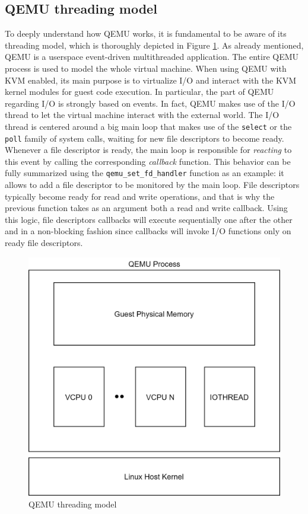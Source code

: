 \subsection{QEMU threading model}
To deeply understand how QEMU works, it is fundamental to be aware of its threading model, which is thoroughly depicted in Figure \ref{fig:qemu}. As already mentioned, QEMU is a userspace event-driven multithreaded application. The entire QEMU process is used to model the whole virtual machine. When using QEMU with KVM enabled, its main purpose is to virtualize I/O and interact with the KVM kernel modules for guest code execution. In particular, the part of QEMU regarding I/O is strongly based on events. In fact, QEMU makes use of the I/O thread to let the virtual machine interact with the external world. The I/O thread is centered around a big main loop that makes use of the \texttt{select} or the \texttt{poll} family of system calls, waiting for new file descriptors to become ready. Whenever a file descriptor is ready, the main loop is responsible for \emph{reacting} to this event by calling the corresponding \emph{callback} function. This behavior can be fully summarized using the \texttt{qemu\_set\_fd\_handler} function as an example: it allows to add a file descriptor to be monitored by the main loop. File descriptors typically become ready for read and write operations, and that is why the previous function takes as an argument both a read and write callback. Using this logic, file descriptors callbacks will execute sequentially one after the other and in a non-blocking fashion since callbacks will invoke I/O functions only on ready file descriptors.

\begin{figure}[t]
    \centering
    \includegraphics{images/qemu.png}
    \caption{QEMU threading model}
    \label{fig:qemu}
\end{figure}

